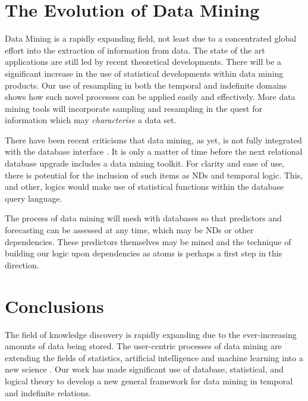 \section{The Evolution of Data Mining}

Data Mining is a rapidly expanding field, not least due to a
concentrated global effort into the extraction of information from
data. The state of the art applications are still led by recent
theoretical developments. There will be a significant increase in the
use of statistical developments within data mining products. Our use
of resampling in both the temporal and indefinite domains shows how
such novel processes can be applied easily and effectively. More data
mining tools will incorporate sampling and resampling in the quest for
information which may {\em characterise} a data set.

\medskip

There have been recent criticisms that data mining, as yet, is not
fully integrated with the database interface \cite{man97,joh97,cha98}. It is
only a matter of time before the next relational database upgrade
includes a data mining toolkit. For clarity and ease of use, there is
potential for the inclusion of such items as NDs and temporal logic. This,
and other, logics would make use of statistical functions within the 
database query language.  

\medskip
The process of data mining will mesh with databases so that predictors
and forecasting can be assessed at any time, which may be NDs or other
dependencies. These predictors themselves may be mined and
the technique of building our logic
upon dependencies as atoms is perhaps a first step in this direction. 

\section{Conclusions}

The field of knowledge discovery is rapidly expanding due to the
ever-increasing amounts of data being stored. The user-centric
processes of data mining are extending the fields of statistics,
artificial intelligence and machine learning into a new science
\cite{fu96}. Our work has made significant use of database,
statistical, and logical theory to develop a new general framework for
data mining in temporal and indefinite relations.




